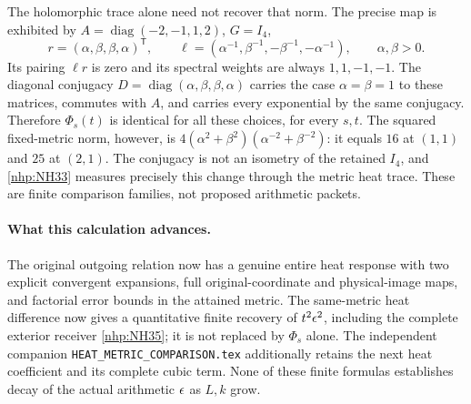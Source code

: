 \documentclass[11pt]{article}
\begin{document}
The holomorphic trace alone need not recover that norm.
The precise map is exhibited by
\(A=\operatorname{diag}(-2,-1,1,2)\), \(G=I_4\),
\[
r=(\alpha,\beta,\beta,\alpha)^{\mathsf T},\qquad
\ell=(\alpha^{-1},\beta^{-1},-\beta^{-1},-\alpha^{-1}),
\qquad \alpha,\beta>0.
\]
Its pairing \(\ell r\) is zero and its spectral weights
are always \(1,1,-1,-1\).
The diagonal conjugacy
\(D=\operatorname{diag}(\alpha,\beta,\beta,\alpha)\)
carries the case \(\alpha=\beta=1\) to these matrices,
commutes with \(A\), and carries every exponential by
the same conjugacy. Therefore \(\Phi_s(t)\) is identical
for all these choices, for every \(s,t\).
The squared fixed-metric norm, however, is
\(4(\alpha^2+\beta^2)(\alpha^{-2}+\beta^{-2})\):
it equals \(16\) at \((1,1)\) and \(25\) at \((2,1)\).
The conjugacy is not an isometry of the retained
\(I_4\), and \eqref{nhp:NH33} measures precisely this
change through the metric heat trace.
These are finite comparison families, not proposed
arithmetic packets.

\paragraph{What this calculation advances.}
The original outgoing relation now has a genuine entire
heat response with two explicit convergent expansions,
full original-coordinate and physical-image maps, and
factorial error bounds in the attained metric.
The same-metric heat difference now gives a quantitative
finite recovery of \(t^2\epsilon^2\), including the complete
exterior receiver \eqref{nhp:NH35}; it is not replaced by
\(\Phi_s\) alone. The independent companion
\texttt{HEAT\_METRIC\_COMPARISON.tex} additionally retains
the next heat coefficient and its complete cubic term.
None of these finite formulas establishes decay of the
actual arithmetic \(\epsilon\) as \(L,k\) grow.
\end{document}
